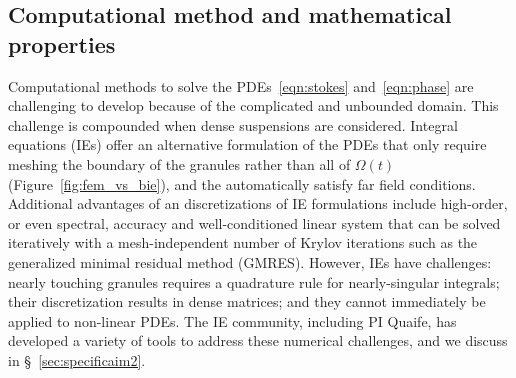 \subsection{Computational method and mathematical properties}
Computational methods to solve the PDEs~\eqref{eqn:stokes}
and~\eqref{eqn:phase} are challenging to develop because of
the complicated and unbounded domain.
This challenge is compounded when dense
suspensions are considered. Integral equations (IEs) offer an
alternative formulation of the PDEs that only require meshing the
boundary of the granules rather than all of $\Omega(t)$
(Figure~\ref{fig:fem_vs_bie}), and the automatically satisfy far field
conditions. Additional advantages of an discretizations of IE
formulations include high-order, or even spectral, accuracy and
well-conditioned linear system that can be solved iteratively with a
mesh-independent number of Krylov iterations such as the generalized
minimal residual method (GMRES). However, IEs have challenges: nearly
touching granules requires a quadrature rule for nearly-singular
integrals; their discretization results in dense matrices; and they
cannot immediately be applied to non-linear PDEs. The IE community,
including PI Quaife, has developed a variety of tools to address these
numerical challenges, and we discuss in \S~\ref{sec:specificaim2}.

